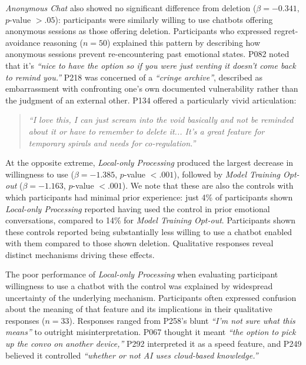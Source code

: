 \documentclass[letterpaper,twocolumn,10pt]{article}
\begin{document}
\emph{Anonymous Chat} also showed no significant difference from deletion ($\beta = -0.341$, $p$-value $> .05$): participants were similarly willing to use chatbots offering anonymous sessions as those offering deletion. Participants who expressed regret-avoidance reasoning ($n=50$) explained this pattern by describing how anonymous sessions prevent re-encountering past emotional states. P082 noted that it's \textit{``nice to have the option so if you were just venting it doesn't come back to remind you.''} P218 was concerned of a \textit{``cringe archive''}, described as embarrassment with confronting one's own documented vulnerability rather than the judgment of an external other. P134 offered a particularly vivid articulation:

\begin{quote}
\textit{``I love this, I can just scream into the void basically and not be reminded about it or have to remember to delete it... It's a great feature for temporary spirals and needs for co-regulation.''}
\end{quote}

 At the opposite extreme, \emph{Local-only Processing} produced the largest decrease in willingness to use ($\beta = -1.385$, $p$-value $< .001$), followed by \emph{Model Training Opt-out} ($\beta = -1.163$, $p$-value $< .001$). We note that these are also the controls with which participants had minimal prior experience: just 4\% of participants shown \emph{Local-only Processing} reported having used the control in prior emotional conversations, compared to 14\% for \emph{Model Training Opt-out}. Participants shown these controls reported being substantially less willing to use a chatbot enabled with them compared to those shown deletion. Qualitative responses reveal distinct mechanisms driving these effects.

The poor performance of \emph{Local-only Processing} when evaluating participant willingness to use a chatbot with the control was explained by widespread uncertainty of the underlying mechanism. Participants often expressed confusion about the meaning of that feature and its implications in their qualitative responses ($n=33$). Responses ranged from P258's blunt \textit{``I'm not sure what this means''} to outright misinterpretation. P067 thought it meant \textit{``the option to pick up the convo on another device,''} P292 interpreted it as a speed feature, and P249 believed it controlled \textit{``whether or not AI uses cloud-based knowledge.''}
\end{document}
